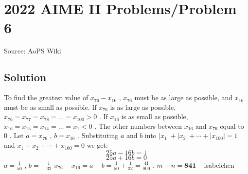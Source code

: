 \documentclass[12pt]{article}
\begin{document}
\section*{{2022 AIME II Problems/Problem 6}}
Source: AoPS Wiki

\subsection*{Solution}
To find the greatest value of $x_{76} - x_{16}$ , $x_{76}$ must be as large as possible, and $x_{16}$ must be as small as possible. If $x_{76}$ is as large as possible, $x_{76} = x_{77} = x_{78} = \dots = x_{100} > 0$ . If $x_{16}$ is as small as possible, $x_{16} = x_{15} = x_{14} = \dots = x_{1} < 0$ . The other numbers between $x_{16}$ and $x_{76}$ equal to $0$ . Let $a = x_{76}$ , $b = x_{16}$ . Substituting $a$ and $b$ into $|x_1| + |x_2| + \cdots + |x_{100}| = 1$ and $x_1 + x_2 + \cdots + x_{100} = 0$ we get: \[25a - 16b = 1\] \[25a + 16b = 0\] $a = \frac{1}{50}$ , $b = -\frac{1}{32}$ $x_{76} - x_{16} = a - b = \frac{1}{50} + \frac{1}{32} = \frac{41}{800}$ . $m+n = \boxed{\textbf{841}}$ ~ isabelchen
\end{document}
